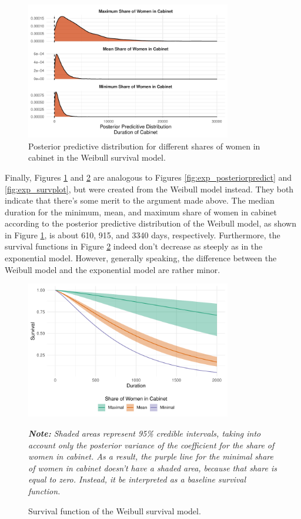 \documentclass[11pt]{article}
\newcommand\fnote[1]{\captionsetup{font=footnotesize}\caption*{\textit{#1}}}
\newcommand\minp[1]{\begin{minipage}{0.8\textwidth} #1 \end{minipage}}
\begin{document}
\begin{figure}[!ht]
    \centering
    \minp{\caption{Posterior predictive distribution for different shares of women in cabinet in the Weibull survival model.} \label{fig:weib_posteriorpredict}}
    \includegraphics[width = 0.8\textwidth]{figures/fig3_weib_posteriorpredict.pdf}
\end{figure}

Finally, Figures \ref{fig:weib_posteriorpredict} and \ref{fig:weib_survplot} are analogous to Figures \ref{fig:exp_posteriorpredict} and \ref{fig:exp_survplot}, but were created from the Weibull model instead. They both indicate that there's some merit to the argument made above. The median duration for the minimum, mean, and maximum share of women in cabinet according to the posterior predictive distribution of the Weibull model, as shown in Figure \ref{fig:weib_posteriorpredict}, is about 610, 915, and 3340 days, respectively. Furthermore, the survival functions in Figure \ref{fig:weib_survplot} indeed don't decrease as steeply as in the exponential model. However, generally speaking, the difference between the Weibull model and the exponential model are rather minor. 

\begin{figure}[!ht]
    \centering
    \minp{\caption{Survival function of the Weibull survival model.} \label{fig:weib_survplot}}
    \includegraphics[width = 0.8\textwidth]{figures/fig4_weib_survplot.pdf}
    \minp{\fnote{\textbf{Note:} Shaded areas represent 95\% credible intervals, taking into account only the posterior variance of the coefficient for the share of women in cabinet. As a result, the purple line for the minimal share of women in cabinet doesn't have a shaded area, because that share is equal to zero. Instead, it be interpreted as a baseline survival function.}}
\end{figure}
\end{document}
